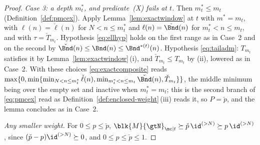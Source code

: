 \begin{proof}
\emph{Case 3: a depth $m^{\ast}_t$, and predicate~(X) fails at $t$.} Then
$m^{\ast}_t\le m_t$ (Definition~\ref{def:pmcex}). Apply
Lemma~\ref{lem:exactwindow} at $t$ with $m^{\ast}=m_t$, with
$\ell(n)=\check\ell(n)$ for $N<n\le m^{\ast}_t$ and $\ell(n)=\check\Bnd(n)$ for
$m^{\ast}_t<n\le m_t$, and with $\tau=\check T_{m_t}$. Hypothesis
\eqref{eq:ellhyp} holds on the first range as in Case~2 and on the second by
$\check\Bnd(n)\le\Bnd(n)\le\Bnd^{\ast(t)}(n)$. Hypothesis \eqref{eq:tailadm}:
$T_{m_t}$ satisfies it by Lemma~\ref{lem:exactwindow}\,(i), and
$\check T_{m_t}\le T_{m_t}$ by (ii), lowered as in Case~2. With these choices
\eqref{eq:exactcomposite} reads
$\max\{0,\min\{\min_{N<n\le m^{\ast}_t}\check\ell(n),
\min_{m^{\ast}_t<n\le m_t}\check\Bnd(n),\check T_{m_t}\}\}$, the middle minimum
being over the empty set and inactive when $m^{\ast}_t=m_t$; this is the
second branch of \eqref{eq:pmcex} read as
Definition~\ref{def:enclosed-weight}\,(iii) reads it, so $P=\check p$, and the
lemma concludes as in Case~2.

\emph{Any smaller weight.} For $0\le p\le\check p$,
$\blk{M}{\gtN}_{\mc|t}\succeq\check p\,\id^{(>N)}\succeq p\,\id^{(>N)}$, since
$(\check p-p)\id^{(>N)}\succeq0$, and $0\le p\le\check p\le1$.
\end{proof}
